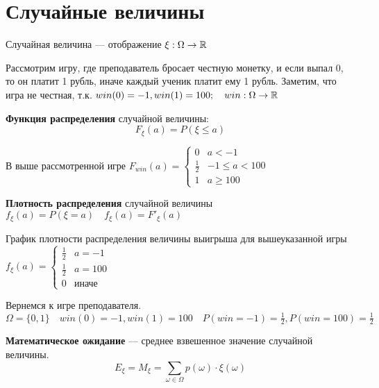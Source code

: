 

\cfoot{}


    
\section{Случайные величины}

\begin{definition}
    Случайная величина --- отображение $\xi : \Omega \to \mathbb{R}$
\end{definition}

Рассмотрим игру, где преподаватель бросает честную монетку, и если выпал 0, то он платит 1 рубль, иначе каждый ученик платит ему 1 рубль. Заметим, что игра не честная, т.к. $win(0) = -1, win(1)=100; \quad win : \Omega \to \mathbb{R}$

\begin{definition}
    \textbf{Функция распределения} случайной величины:
    $$F_\xi(a)=P(\xi\leq a)$$
\end{definition}

В выше рассмотренной игре $F_{win}(a)=\begin{cases}
    0 & a<-1 \\
    \frac{1}{2} & -1\leq a < 100 \\
    1 & a \geq 100
\end{cases}$

\begin{definition}
    \textbf{Плотность распределения} случайной величины $f_\xi(a)=P(\xi=a) \quad f_\xi(a)=F'_\xi(a)$
\end{definition}

График плотности распределения величины выигрыша для вышеуказанной игры $f_\xi(a)=\begin{cases}
    \frac{1}{2} & a=-1 \\
    \frac{1}{2} & a=100 \\
    0 & \text{иначе}
\end{cases}$

Вернемся к игре преподавателя. $\Omega = \{0, 1\} \quad win(0)=-1, win(1)=100 \quad P(win = -1) = \frac{1}{2}, P(win = 100) = \frac{1}{2}$

\begin{definition}
    \textbf{Математическое ожидание} --- среднее взвешенное значение случайной величины.
    $$E_\xi=M_\xi=\sum\limits_{\omega \in \Omega} p(\omega) \cdot \xi(\omega)$$
\end{definition}

